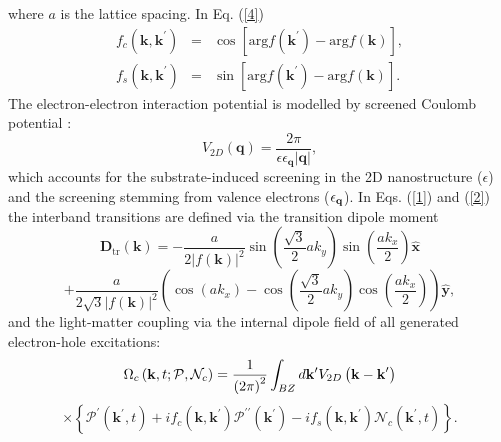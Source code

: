 \documentclass[reprint, superscriptaddress,  aps, pra]{revtex4-2}
\begin{document}
where $a$ is the lattice spacing. In Eq. (\ref{4}) 
\begin{eqnarray*}
f_{c}\left( \mathbf{k,k}^{\prime }\right) &=&\cos \left[ \mathrm{arg}f\left( 
\mathbf{k}^{\prime }\right) -\mathrm{arg}f\left( \mathbf{k}\right) \right] ,
\\
f_{s}\left( \mathbf{k,k}^{\prime }\right) &=&\sin \left[ \mathrm{arg}f\left( 
\mathbf{k}^{\prime }\right) -\mathrm{arg}f\left( \mathbf{k}\right) \right] .
\end{eqnarray*}%
The electron-electron interaction potential is modelled by screened Coulomb
potential \cite{Knorr2}: 
\begin{equation}
V_{2D}\left( \mathbf{q}\right) =\frac{2\pi }{\epsilon \epsilon _{\mathbf{q}%
}\left\vert \mathbf{q}\right\vert },  \label{6}
\end{equation}%
which accounts for the substrate-induced screening in the 2D nanostructure ($%
\epsilon $) and the screening stemming from valence electrons ($\epsilon _{%
\mathbf{q}}$). In Eqs. (\ref{1}) and (\ref{2}) the interband transitions are
defined via the transition dipole moment%
\begin{equation*}
\mathbf{D}_{\mathrm{tr}}\left( \mathbf{k}\right) =-\frac{a}{2\left\vert
f\left( \mathbf{k}\right) \right\vert ^{2}}\sin \left( \frac{\sqrt{3}}{2}%
ak_{y}\right) \sin \left( \frac{ak_{x}}{2}\right) \widehat{\mathbf{x}}
\end{equation*}%
\begin{equation}
+\frac{a}{2\sqrt{3}\left\vert f\left( \mathbf{k}\right) \right\vert ^{2}}%
\left( \cos \left( ak_{x}\right) -\cos \left( \frac{\sqrt{3}}{2}%
ak_{y}\right) \cos \left( \frac{ak_{x}}{2}\right) \right) \widehat{\mathbf{y}%
},  \label{7}
\end{equation}%
and the light-matter coupling via the internal dipole field of all generated
electron-hole excitations: 
\begin{equation*}
\Omega _{c}\left( \mathbf{k},t;\mathcal{P},\mathcal{N}_{c}\right) =\frac{1}{%
\left( 2\pi \right) ^{2}}\int_{BZ}d\mathbf{k}^{\prime }V_{2D}\left( \mathbf{%
k-k}^{\prime }\right)
\end{equation*}%
\begin{equation}
\times \left\{ \mathcal{P}^{\prime }\left( \mathbf{k}^{\prime },t\right)
+if_{c}\left( \mathbf{k,k}^{\prime }\right) \mathcal{P}^{\prime \prime
}\left( \mathbf{k}^{\prime }\right) -if_{s}\left( \mathbf{k,k}^{\prime
}\right) \mathcal{N}_{c}\left( \mathbf{k}^{\prime },t\right) \right\} .
\label{8}
\end{equation}%
\end{document}
